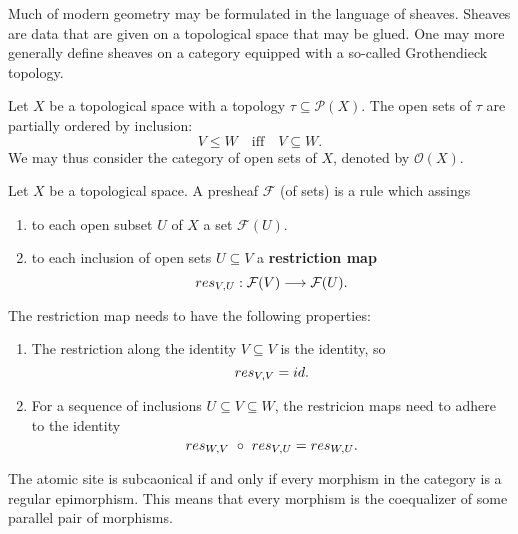 Much of modern geometry may be formulated in the language of sheaves. Sheaves are data that are given on a topological space that may be glued. One may more generally define sheaves on a category equipped with a so-called Grothendieck topology.

\begin{construction} 
  Let $X$ be a topological space with a topology $\tau \subseteq \mathcal{P}(X)$. The open sets of $\tau$ are partially ordered by inclusion: \[V \le W \quad \text{iff} \quad V \subseteq W.\]
  We may thus consider the category of open sets of $X$, denoted by $\mathcal{O}(X)$.

\end{construction}


\begin{definition}
  Let $X$ be a topological space. A presheaf $\mathcal{F}$ (of sets) is a rule which assings
  \begin{enumerate}
    \item to each open subset $U$ of $X$ a set $\mathcal{F}(U)$.
    \item to each inclusion of open sets $U \subseteq V$ a \textbf{restriction map}
    \[res_{V\kern-0.1em , U}: \mathcal{F}(V) \longrightarrow\mathcal{F}(U).\]
  \end{enumerate}
    The restriction map needs to have the following properties: 
    \begin{enumerate}
      \item The restriction along the identity $V \subseteq V$ is the identity, so 
            \[res_{V\kern-0.1em , V} = id.\]
      \item For a sequence of inclusions $U \subseteq V \subseteq W$, the restricion maps need to adhere to the identity 
            \[res_{W\kern-0.1em , V}\ \circ\ res_{V\kern-0.1em , U} = res_{W\kern-0.1em , U}.\]
    \end{enumerate}
\end{definition}

\begin{definition}
  
\end{definition}

\begin{definition}

\end{definition}
The atomic site is subcaonical if and only if every morphism in the category is a regular epimorphism. This means that every morphism is the coequalizer of some parallel pair of morphisms.

